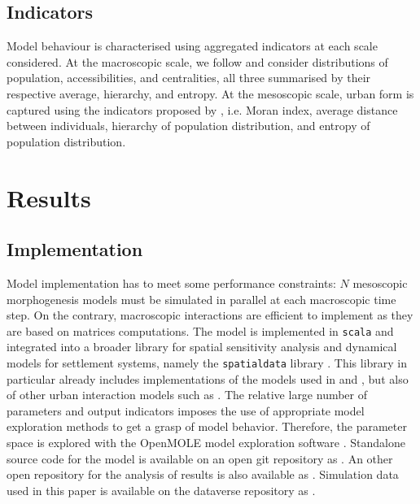 \documentclass[referee,lineno,pdflatex,sn-apa]{sn-jnl}
\begin{document}






\subsection{Indicators}

Model behaviour is characterised using aggregated indicators at each scale considered. At the  macroscopic scale, we follow \cite{raimbault2020unveiling} and consider distributions of population, accessibilities, and centralities, all three summarised by their respective average, hierarchy, and entropy. At the mesoscopic scale, urban form is captured using the indicators proposed by \cite{raimbault2018calibration}, i.e. Moran index, average distance between individuals, hierarchy of population distribution, and entropy of population distribution.


\section{Results}


\subsection{Implementation}

Model implementation has to meet some performance constraints: $N$ mesoscopic morphogenesis models must be simulated in parallel at each macroscopic time step. On the contrary, macroscopic interactions are efficient to implement as they are based on matrices computations. The model is implemented in \texttt{scala} and integrated into a broader library for spatial sensitivity analysis and dynamical models for settlement systems, namely the \texttt{spatialdata} library \citep{raimbault2020scala}. This library in particular already includes implementations of the models used in \cite{raimbault2020indirect} and \cite{raimbault2018calibration}, but also of other urban interaction models such as \cite{favaro2011gibrat}. The relative large number of parameters and output indicators imposes the use of appropriate model exploration methods to get a grasp of model behavior. Therefore, the parameter space is explored with the OpenMOLE model exploration software \citep{reuillon2013openmole}. Standalone source code for the model is available on an open git repository as \cite{urbangrowthmodel}. An other open repository for the analysis of results is also available as \cite{urbangrowth}. Simulation data used in this paper is available on the dataverse repository as \cite{dataverse}.
\end{document}
